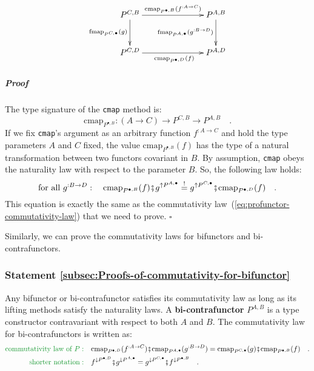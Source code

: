 \begin{wrapfigure}{i}{0.37\columnwidth}%
\vspace{-1.7\baselineskip}
\[
\xymatrix{\xyScaleY{2.5pc}\xyScaleX{6.0pc}P^{C,B}\ar[r]\sp(0.55){\text{cmap}_{P^{\bullet,B}}(f^{:A\rightarrow C})~~~}\ar[d]\sb(0.45){\text{fmap}_{P^{C,\bullet}}(g)} & P^{A,B}\ar[d]\sb(0.45){\text{fmap}_{P^{A,\bullet}}(g^{:B\rightarrow D})}\\
P^{C,D}\ar[r]\sb(0.45){~~~~\text{cmap}_{P^{\bullet,D}}(f)} & P^{A,D}
}
\]

\vspace{-1.7\baselineskip}
\end{wrapfigure}%


\subparagraph{Proof}

The type signature of the \lstinline!cmap! method is:
\[
\text{cmap}_{P^{\bullet,B}}:(A\rightarrow C)\rightarrow P^{C,B}\rightarrow P^{A,B}\quad.
\]
If we fix \lstinline!cmap!\textsf{'}s argument as an arbitrary function $f^{:A\rightarrow C}$
and hold the type parameters $A$ and $C$ fixed, the value $\text{cmap}_{P^{\bullet,B}}(f)$
has the type of a natural transformation between two functors covariant
in $B$. By assumption, \lstinline!cmap! obeys the naturality law
with respect to the parameter $B$. So, the following law holds:
\[
\text{for all }g^{:B\rightarrow D}:\quad\text{cmap}_{P^{\bullet,B}}(f)\bef g^{\uparrow P^{A,\bullet}}\overset{!}{=}g^{\uparrow P^{C,\bullet}}\bef\text{cmap}_{P^{\bullet,D}}(f)\quad.
\]
This equation is exactly the same as the commutativity law~(\ref{eq:profunctor-commutativity-law})
that we need to prove. $\square$

Similarly, we can prove the commutativity laws for bifunctors and
bi-contrafunctors.

\subsubsection{Statement \label{subsec:Proofs-of-commutativity-for-bifunctor}\ref{subsec:Proofs-of-commutativity-for-bifunctor}}

Any bifunctor or bi-contrafunctor satisfies its commutativity law
as long as its lifting methods satisfy the naturality laws. A \textbf{bi-contrafunctor}
$P^{A,B}$ is a type constructor contravariant with respect to both
$A$ and $B$. The commutativity law for bi-contrafunctors is written
as:
\begin{align}
{\color{greenunder}\text{commutativity law of }P:}\quad & \text{cmap}_{P^{\bullet,D}}(f^{:A\rightarrow C})\bef\text{cmap}_{P^{A,\bullet}}(g^{:B\rightarrow D})=\text{cmap}_{P^{C,\bullet}}(g)\bef\text{cmap}_{P^{\bullet,B}}(f)\quad.\nonumber \\
{\color{greenunder}\text{shorter notation}:}\quad & f^{\downarrow P^{\bullet,D}}\bef g^{\downarrow P^{A,\bullet}}=g^{\downarrow P^{C,\bullet}}\bef f^{\downarrow P^{\bullet,B}}\quad.\label{eq:bi-contrafunctor-commutativity-law}
\end{align}

